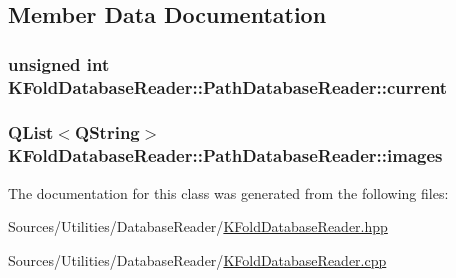 \subsection{Member Data Documentation}
\hypertarget{class_k_fold_database_reader_1_1_path_database_reader_a2e6d3113ba8d5a4d1f48103a9219fcc7}{
\subsubsection[{current}]{\setlength{\rightskip}{0pt plus 5cm}unsigned int K\+Fold\+Database\+Reader\+::\+Path\+Database\+Reader\+::current\hspace{0.3cm}{\ttfamily [private]}}}\label{class_k_fold_database_reader_1_1_path_database_reader_a2e6d3113ba8d5a4d1f48103a9219fcc7}
\hypertarget{class_k_fold_database_reader_1_1_path_database_reader_a9b8942b3921fcc44a115fb1d4eb6b49c}{
\subsubsection[{images}]{\setlength{\rightskip}{0pt plus 5cm}Q\+List$<$Q\+String$>$ K\+Fold\+Database\+Reader\+::\+Path\+Database\+Reader\+::images\hspace{0.3cm}{\ttfamily [private]}}}\label{class_k_fold_database_reader_1_1_path_database_reader_a9b8942b3921fcc44a115fb1d4eb6b49c}


The documentation for this class was generated from the following files\+:\begin{DoxyCompactItemize}
\item 
Sources/\+Utilities/\+Database\+Reader/\hyperlink{_k_fold_database_reader_8hpp}{K\+Fold\+Database\+Reader.\+hpp}\item 
Sources/\+Utilities/\+Database\+Reader/\hyperlink{_k_fold_database_reader_8cpp}{K\+Fold\+Database\+Reader.\+cpp}\end{DoxyCompactItemize}
